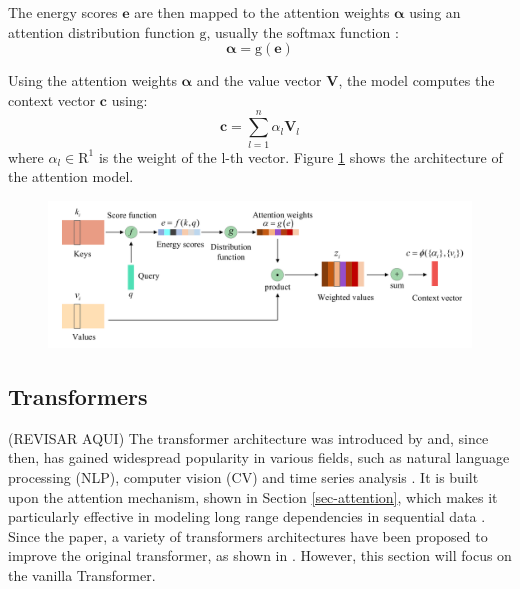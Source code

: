 The energy scores $\boldsymbol{e}$ are then mapped to the attention weights $\boldsymbol{\alpha}$ using an attention distribution function $\mathrm{g}$, usually the softmax function \cite{NIU202148}:
\begin{equation}
    \boldsymbol{\alpha} = \mathrm{g}(\boldsymbol{e})
\end{equation}

Using the attention weights $\boldsymbol{\alpha}$ and the value vector $\boldsymbol{V}$, the model computes the context vector $\boldsymbol{c}$ using:
\begin{equation}
    \boldsymbol{c} = \sum_{l=1}^{n} \alpha_l \boldsymbol{V}_l  
\end{equation}
where $\alpha_l \in \mathrm{R}^1$ is the weight of the l-th vector. Figure \ref{fig:Attention-struct} shows the architecture of the attention model.

\begin{figure}[H]
    \centering
    \includegraphics[width=12cm]{Cap2_LitReview/model_basics/Attention/attention-struct.png}
    \caption{\cite{NIU202148}}
    \label{fig:Attention-struct}
\end{figure}

\subsection{Transformers}
(REVISAR AQUI)
The transformer architecture was introduced by \cite{vaswani2023attentionneed} and, since then, has gained widespread popularity in various fields, such as natural language processing (NLP), computer vision (CV) and time series analysis \cite{lin2021surveytransformers,wen2023transformerstimeseriessurvey}. It is built upon the attention mechanism, shown in Section \ref{sec-attention}, which makes it particularly effective in modeling long range dependencies in sequential data \cite{wen2023transformerstimeseriessurvey}. Since the \cite{vaswani2023attentionneed} paper, a variety of transformers architectures have been proposed to improve the original transformer, as shown in \cite{lin2021surveytransformers}. However, this section will focus on the vanilla Transformer.

